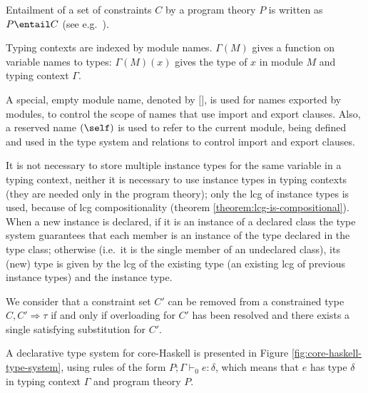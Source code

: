 Entailment of a set of constraints $C$ by a program theory $P$ is
written as $P \entail C$ (see
e.g.~\cite{JBCS-Ambiguity-and-constrained-polymorphism}).

Typing contexts are indexed by module names. $\Gamma(M)$ gives a
function on variable names to types: $\Gamma(M)(x)$ gives the type of
$x$ in module $M$ and typing context $\Gamma$.
   
A special, empty module name, denoted by $\texttt{[]}$, is used for
names exported by modules, to control the scope of names that use
import and export clauses. Also, a reserved name $(\self)$ is used to
refer to the current module, being defined and used in the type system
and relations to control import and export clauses.

It is not necessary to store multiple instance types for the same
variable in a typing context, neither it is necessary to use instance
types in typing contexts (they are needed only in the program theory);
only the lcg of instance types is used, because of lcg
compositionality (theorem \ref{theorem:lcg-is-compositional}). When a
new instance is declared, if it is an instance of a declared class the
type system guarantees that each member is an instance of the type
declared in the type class; otherwise (i.e.~it is the single member of
an undeclared class), its (new) type is given by the lcg of the
existing type (an existing lcg of previous instance types) and the
instance type.

We consider that a constraint set $C'$ can be removed from a
constrained type $C,C' \Rightarrow \tau$ if and only if overloading
for $C'$ has been resolved and there exists a single satisfying
substitution for
$C'$\cite{JBCS-Ambiguity-and-constrained-polymorphism}.


A declarative type system for core-Haskell is presented in Figure
\ref{fig:core-haskell-type-system}, using rules of the form $P;\Gamma
\vdash_0 e:\delta$, which means that $e$ has type $\delta$ in typing
context $\Gamma$ and program theory $P$. 

